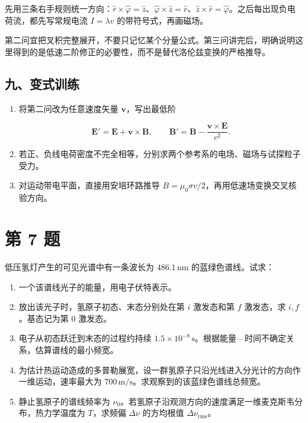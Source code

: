\documentclass[12pt,a4paper,UTF8]{ctexart}
\newcommand{\tightlist}{\setlength{\itemsep}{0pt}\setlength{\parskip}{0pt}}
\begin{document}
先用三条右手规则统一方向：\(\hat r\times\hat\varphi=\hat z\)、\(\hat\varphi\times\hat z=\hat r\)、\(\hat z\times\hat r=\hat\varphi\)。之后每出现负电荷流，都先写常规电流
\(I=\lambda v\) 的带符号式，再画磁场。

第二问宜把叉积完整展开，不要只记忆某个分量公式。第三问讲完后，明确说明这里得到的是低速二阶修正的必要性，而不是替代洛伦兹变换的严格推导。

\subsection{九、变式训练}\label{ux4e5dux53d8ux5f0fux8badux7ec3-5}

\begin{enumerate}
\def\labelenumi{\arabic{enumi}.}
\item
  将第二问改为任意速度矢量 \(\bm v\)，写出最低阶

  \[\bm E'=\bm E+\bm v\times\bm B,
  \qquad
  \bm B'=\bm B-\frac{\bm v\times\bm E}{c^2}.\]
\item
  若正、负线电荷密度不完全相等，分别求两个参考系的电场、磁场与试探粒子受力。
\item
  对运动带电平面，直接用安培环路推导
  \(B=\mu_0\sigma v/2\)，再用低速场变换交叉核验方向。
\end{enumerate}

\newpage

\section{第 7 题}\label{ux7b2c-7-ux9898}

低压氢灯产生的可见光谱中有一条波长为 \(486.1\,\mathrm{nm}\)
的蓝绿色谱线。试求：

\begin{enumerate}
\def\labelenumi{\arabic{enumi}.}
\tightlist
\item
  一个该谱线光子的能量，用电子伏特表示。
\item
  放出该光子时，氢原子初态、末态分别处在第 \(i\) 激发态和第 \(f\)
  激发态，求 \(i,f\)。基态记为第 \(0\) 激发态。
\item
  电子从初态跃迁到末态的过程约持续
  \(1.5\times10^{-8}\,\mathrm{s}\)。根据能量---时间不确定关系，估算谱线的最小频宽。
\item
  为估计热运动造成的多普勒展宽，设一群氢原子只沿光线进入分光计的方向作一维运动，速率最大为
  \(700\,\mathrm{m/s}\)。求观察到的该蓝绿色谱线总频宽。
\item
  静止氢原子的谱线频率为
  \(\nu_0\)。若氢原子沿观测方向的速度满足一维麦克斯韦分布，热力学温度为
  \(T\)，求频偏 \(\Delta\nu\) 的方均根值 \(\Delta\nu_{\mathrm{rms}}\)。
\end{enumerate}
\end{document}

